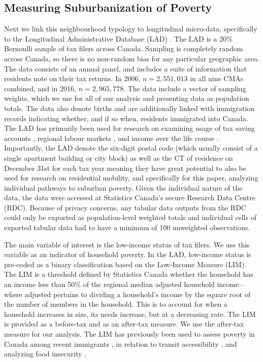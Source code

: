\subsection{Measuring Suburbanization of Poverty}

Next we link this neighbourhood typology to longitudinal micro-data, specifically to the Longitudinal Administrative Database (LAD) \cite{government_of_canada_longitudinal_2020}. The LAD is a 20\% Bernoulli sample of tax filers across Canada. Sampling is completely random across Canada, so there is no non-random bias for any particular geographic area. The data consists of an annual panel, and includes a suite of information that residents note on their tax returns. In 2006, $n = 2,551,013$ in all nine CMAs combined, and in 2016, $n = 2,965,778$. The data include a vector of sampling weights, which we use for all of our analysis and presenting data as population totals. The data also denote births and are additionally linked with immigration records indicating whether, and if so when, residents immigrated into Canada. The LAD has primarily been used for research on examining usage of tax saving accounts \cite{berger_empirical_2019}, regional labour markets \cite{albouy_local_2019}, and income over the life course \cite{denton_age-income_2019}. Importantly, the LAD denote the six-digit postal code (which usually consist of a single apartment building or city block) as well as the CT of residence on December 31st for each tax year meaning they have great potential to also be used for research on residential mobility, and specifically for this paper, analyzing individual pathways to suburban poverty. Given the individual nature of the data, the data were accessed at Statistics Canada's secure Research Data Centre (RDC). Because of privacy concerns, any tabular data outputs from the RDC could only be exported as population-level weighted totals and individual cells of exported tabular data had to have a minimum of 100 unweighted observations.

The main variable of interest is the low-income status of tax filers. We use this variable as an indicator of household poverty. In the LAD, low-income status is pre-coded as a binary classification based on the Low-Income Measure (LIM). The LIM is a threshold defined by Statistics Canada whether the household has an income less than 50\% of the regional median adjusted household income---where adjusted pertains to dividing a household's income by the square root of the number of members in the household. This is to account for when a household increases in size, its needs increase, but at a decreasing rate. The LIM is provided as a before-tax and as an after-tax measure. We use the after-tax measure for our analysis. The LIM has previously been used to assess poverty in Canada among recent immigrants \cite{picot_immigration_2014}, in relation to transit accessibility \cite{allen_sizing_2019}, and analyzing food insecurity \cite{brown_money_2019}. 

